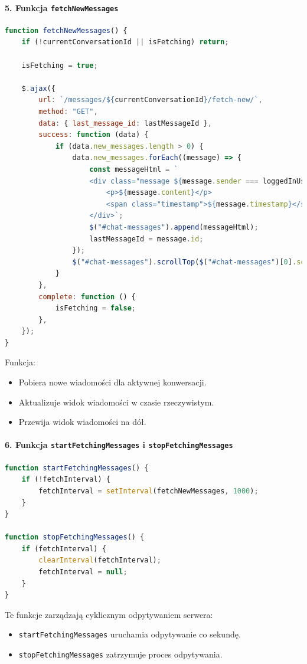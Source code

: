 \documentclass[12pt,a4paper,oneside]{article}
\theoremstyle{definition}
\numberwithin{equation}{section}
\begin{document}
\paragraph{5. Funkcja \texttt{fetchNewMessages}}
\begin{lstlisting}[language=JavaScript, caption=Funkcja \texttt{fetchNewMessages}]
function fetchNewMessages() {
    if (!currentConversationId || isFetching) return;

    isFetching = true;

    $.ajax({
        url: `/messages/${currentConversationId}/fetch-new/`,
        method: "GET",
        data: { last_message_id: lastMessageId },
        success: function (data) {
            if (data.new_messages.length > 0) {
                data.new_messages.forEach((message) => {
                    const messageHtml = `
                    <div class="message ${message.sender === loggedInUser ? "message-sent" : "message-received"}">
                        <p>${message.content}</p>
                        <span class="timestamp">${message.timestamp}</span>
                    </div>`;
                    $("#chat-messages").append(messageHtml);
                    lastMessageId = message.id;
                });
                $("#chat-messages").scrollTop($("#chat-messages")[0].scrollHeight);
            }
        },
        complete: function () {
            isFetching = false;
        },
    });
}
\end{lstlisting}
Funkcja:
\begin{itemize}
    \item Pobiera nowe wiadomości dla aktywnej konwersacji.
    \item Aktualizuje widok wiadomości w czasie rzeczywistym.
    \item Przewija widok wiadomości na dół.
\end{itemize}



\paragraph{6. Funkcja \texttt{startFetchingMessages} i \texttt{stopFetchingMessages}}
\begin{lstlisting}[language=JavaScript, caption=Funkcje do zarządzania cyklicznym odpytywaniem]
function startFetchingMessages() {
    if (!fetchInterval) {
        fetchInterval = setInterval(fetchNewMessages, 1000);
    }
}

function stopFetchingMessages() {
    if (fetchInterval) {
        clearInterval(fetchInterval);
        fetchInterval = null;
    }
}
\end{lstlisting}
Te funkcje zarządzają cyklicznym odpytywaniem serwera:
\begin{itemize}
    \item \texttt{startFetchingMessages} uruchamia odpytywanie co sekundę.
    \item \texttt{stopFetchingMessages} zatrzymuje proces odpytywania.
\end{itemize}
\end{document}
